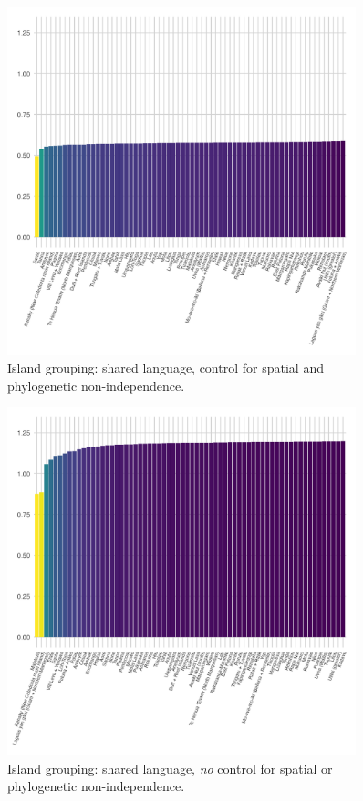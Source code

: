 \documentclass[unnumsec,webpdf,modern,medium]{oup-authoring-template}
\begin{document}
\begin{figure}[ht]
\centering
\includegraphics[width=0.9\textwidth]{brms_medium_control_spatialphylo_dropped_out_plot_diff.png}
\caption{Island grouping: shared language,  control for spatial and phylogenetic non-independence.}
\label{brms_medium_control_spatialphylo_dropped_out_plot_diff}
\end{figure}

\begin{figure}[ht]
\centering
\includegraphics[width=0.9\textwidth]{brms_medium_control_none_dropped_out_plot_diff.png}
\caption{Island grouping: shared language, \emph{no}  control for spatial or phylogenetic non-independence.}
\label{brms_medium_control_none_dropped_out_plot_diff}
\end{figure}
\end{document}
